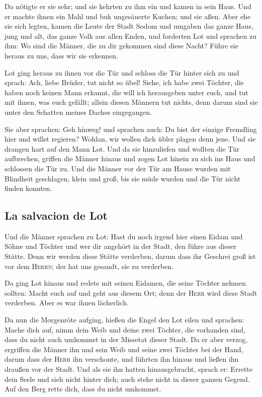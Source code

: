  Da nötigte er sie sehr; und sie kehrten zu ihm ein und
kamen in sein Haus. Und er machte ihnen ein Mahl und buk ungesäuerte
Kuchen; und sie aßen.  Aber ehe sie sich legten, kamen die
Leute der Stadt Sodom und umgaben das ganze Haus, jung und alt, das
ganze Volk aus allen Enden,  und forderten Lot und
sprachen zu ihm: Wo sind die Männer, die zu dir gekommen sind diese
Nacht? Führe sie heraus zu uns, dass wir sie erkennen.

 Lot ging heraus zu ihnen vor die Tür und schloss die Tür
hinter sich zu  und sprach: Ach, liebe Brüder, tut nicht
so übel!  Siehe, ich habe zwei Töchter, die haben noch
keinen Mann erkannt, die will ich herausgeben unter euch, und tut mit
ihnen, was euch gefällt; allein diesen Männern tut nichts, denn darum
sind sie unter den Schatten meines Daches eingegangen.

 Sie aber sprachen: Geh hinweg! und sprachen auch: Du bist
der einzige Fremdling hier und willst regieren? Wohlan, wir wollen dich
übler plagen denn jene. Und sie drangen hart auf den Mann Lot. Und da
sie hinzuliefen und wollten die Tür aufbrechen,  griffen
die Männer hinaus und zogen Lot hinein zu sich ins Haus und schlossen
die Tür zu.  Und die Männer vor der Tür am Hause wurden
mit Blindheit geschlagen, klein und groß, bis sie müde wurden und die
Tür nicht finden konnten.

\hypertarget{la-salvacion-de-lot}{%
\subsection{La salvacion de Lot}\label{la-salvacion-de-lot}}

 Und die Männer sprachen zu Lot: Hast du noch irgend hier
einen Eidam und Söhne und Töchter und wer dir angehört in der Stadt, den
führe aus dieser Stätte.  Denn wir werden diese Stätte
verderben, darum dass ihr Geschrei groß ist vor dem \textsc{Herrn}; der
hat uns gesandt, sie zu verderben.

 Da ging Lot hinaus und redete mit seinen Eidamen, die
seine Töchter nehmen sollten: Macht euch auf und geht aus diesem Ort;
denn der \textsc{Herr} wird diese Stadt verderben. Aber es war ihnen
lächerlich.

 Da nun die Morgenröte aufging, hießen die Engel den Lot
eilen und sprachen: Mache dich auf, nimm dein Weib und deine zwei
Töchter, die vorhanden sind, dass du nicht auch umkommst in der Missetat
dieser Stadt.  Da er aber verzog, ergriffen die Männer
ihn und sein Weib und seine zwei Töchter bei der Hand, darum dass der
\textsc{Herr} ihn verschonte, und führten ihn hinaus und ließen ihn
draußen vor der Stadt.  Und als sie ihn hatten
hinausgebracht, sprach er: Errette dein Seele und sieh nicht hinter
dich; auch stehe nicht in dieser ganzen Gegend. Auf den Berg rette dich,
dass du nicht umkommst.


